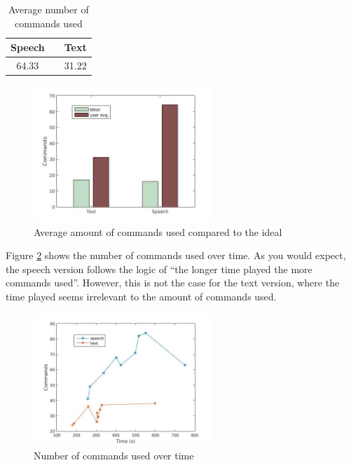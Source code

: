 \begin{table}[ht]
  \centering
  \begin{tabular}{ccc}
    \toprule
    Speech &   & Text\\
    \midrule
    64.33 &   & 31.22\\
    \bottomrule
  \end{tabular}
  \caption{Average number of commands used}\label{avg_cmd} %
\end{table}

\begin{figure}[ht]
  \centering
  \includegraphics[width=0.6\textwidth]{images/ideal_cmd.jpg}
  \caption{Average amount of commands used compared to the ideal}\label{ideal_cmd}
\end{figure}

Figure \ref{time_cmd} shows the number of commands used over time. As you would expect, the speech version follows the logic of ``the longer time played the more commands used''. However, this is not the case for the text version, where the time played seems irrelevant to the amount of commands used.

\begin{figure}[ht]
  \centering
  \includegraphics[width=0.6\textwidth]{images/time_cmd.jpg} %
  \caption{Number of commands used over time}\label{time_cmd}
\end{figure}

